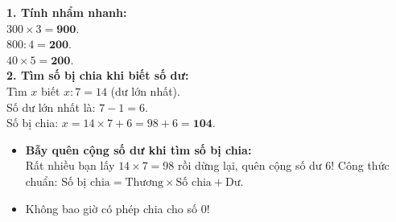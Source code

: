 \documentclass[11pt,a4paper]{article}
\begin{document}
\vspace{-2.5mm}
\noindent
\begin{minipage}[t]{0.49\textwidth}\vspace{0pt}
\begin{tcolorbox}[
  enhanced,
  colback=green!4!white,
  colframe=green!60!black,
  arc=2mm, boxrule=0.8pt,
  left=2mm, right=2mm, top=1.8mm, bottom=1.8mm,
  title={\footnotesize\bfseries\color{white}\faCheckCircle\ Ví dụ thực hành chuẩn mực}
]
{\footnotesize
\textbf{1. Tính nhẩm nhanh:}\\
$300 \times 3 = \mathbf{900}$.\\
$800 : 4 = \mathbf{200}$.\\
$40 \times 5 = \mathbf{200}$.\\
\textbf{2. Tìm số bị chia khi biết số dư:}\\
Tìm $x$ biết $x : 7 = 14$ (dư lớn nhất).\\
Số dư lớn nhất là: $7 - 1 = 6$.\\
Số bị chia: $x = 14 \times 7 + 6 = 98 + 6 = \mathbf{104}$.
}
\end{tcolorbox}
\end{minipage}
\hfill
\begin{minipage}[t]{0.49\textwidth}\vspace{0pt}
\begin{tcolorbox}[
  enhanced,
  colback=red!4!white,
  colframe=red!70!black,
  arc=2mm, boxrule=0.8pt,
  left=2mm, right=2mm, top=1.8mm, bottom=1.8mm,
  title={\footnotesize\bfseries\color{white}\faExclamationTriangle\ Mẹo tránh bẫy trắc nghiệm}
]
{\footnotesize
\begin{itemize}\setlength{\itemsep}{1.5pt}\setlength{\leftskip}{-2.5mm}
  \item \textbf{Bẫy quên cộng số dư khi tìm số bị chia:}\\
  Rất nhiều bạn lấy $14 \times 7 = 98$ rồi dừng lại, quên cộng số dư $6$! Công thức chuẩn: $\text{Số bị chia} = \text{Thương} \times \text{Số chia} + \text{Dư}$.
  \item Không bao giờ có phép chia cho số $0$!
\end{itemize}
}
\end{tcolorbox}
\end{minipage}
\end{document}
